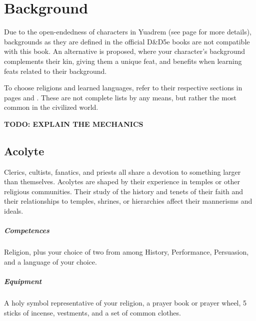 \section{Background}
Due to the open-endedness of characters in Yuadrem (see page \pageref{sec::classlessdnd} for more details), backgrounds as they are defined in the official D\&D5e books are not compatible with this book.
An alternative is proposed, where your character's background complements their kin, giving them a unique feat, and benefits when learning feats related to their background.

To choose religions and learned languages, refer to their respective sections in pages \pageref{ssec::religions} and \pageref{ssec::languages}.
These are not complete lists by any means, but rather the most common in the civilized world. %

\pagebreak



\textbf{TODO: EXPLAIN THE MECHANICS}

\subsection*{Acolyte} \label{ssec::acolyte}
    Clerics, cultists, fanatics, and priests all share a devotion to something larger than themselves.
    Acolytes are shaped by their experience in temples or other religious communities.
    Their study of the history and tenets of their faith and their relationships to temples, shrines, or hierarchies affect their mannerisms and ideals.
    \subparagraph{Competences} Religion, plus your choice of two from among History, Performance, Persuasion, and a language of your choice.
    \subparagraph{Equipment} A holy symbol representative of your religion, a prayer book or prayer wheel, 5 sticks of incense, vestments, and a set of common clothes.


